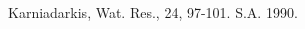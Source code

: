\begin{thebibliography}{9}

        Karniadarkis, \/
        Wat. Res., 24, 97-101.
        S.A. 1990.


\end{thebibliography}
